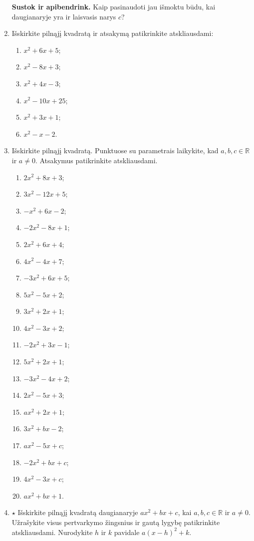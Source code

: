 \documentclass[12pt,a4paper]{article}
\begin{document}
\begin{enumerate}
\textbf{Sustok ir apibendrink.} Kaip pasinaudoti jau išmoktu būdu, kai daugianaryje yra ir laisvasis narys $c$?

\item Išskirkite pilnąjį kvadratą ir atsakymą patikrinkite atskliausdami:
\begin{multicols}{2}\begin{enumerate}
\item $x^2+6x+5$; \item $x^2-8x+3$; \item $x^2+4x-3$; \item $x^2-10x+25$; \item $x^2+3x+1$; \item $x^2-x-2$.
\end{enumerate}\end{multicols}
\item Išskirkite pilnąjį kvadratą. Punktuose su parametrais laikykite, kad $a,b,c\in\mathbb R$ ir $a\ne0$. Atsakymus patikrinkite atskliausdami.
\begin{multicols}{2}\begin{enumerate}
\item $2x^2+8x+3$; \item $3x^2-12x+5$; \item $-x^2+6x-2$; \item $-2x^2-8x+1$; \item $2x^2+6x+4$; \item $4x^2-4x+7$; \item $-3x^2+6x+5$; \item $5x^2-5x+2$;
\item $3x^2+2x+1$;
\item $4x^2-3x+2$;
\item $-2x^2+3x-1$;
\item $5x^2+2x+1$;
\item $-3x^2-4x+2$;
\item $2x^2-5x+3$;
\item $ax^2+2x+1$;
\item $3x^2+bx-2$;
\item $ax^2-5x+c$;
\item $-2x^2+bx+c$;
\item $4x^2-3x+c$;
\item $ax^2+bx+1$.
\end{enumerate}\end{multicols}
\item $\star$ Išskirkite pilnąjį kvadratą daugianaryje $ax^2+bx+c$, kai $a,b,c\in\mathbb R$ ir $a\ne0$. Užrašykite visus pertvarkymo žingsnius ir gautą lygybę patikrinkite atskliausdami. Nurodykite $h$ ir $k$ pavidale $a(x-h)^2+k$.


\end{enumerate}
\end{document}
